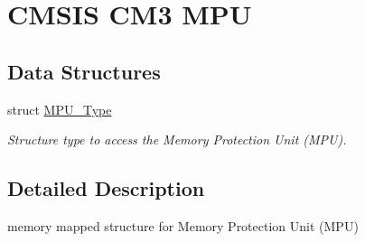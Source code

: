 \hypertarget{group___c_m_s_i_s___c_m3___m_p_u}{\section{C\-M\-S\-I\-S C\-M3 M\-P\-U}
\label{group___c_m_s_i_s___c_m3___m_p_u}
}
\subsection*{Data Structures}
\begin{DoxyCompactItemize}
\item 
struct \hyperlink{struct_m_p_u___type}{M\-P\-U\-\_\-\-Type}
\begin{DoxyCompactList}\small\item\em Structure type to access the Memory Protection Unit (M\-P\-U). \end{DoxyCompactList}\end{DoxyCompactItemize}


\subsection{Detailed Description}
memory mapped structure for Memory Protection Unit (M\-P\-U) 